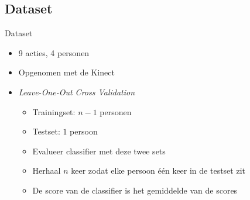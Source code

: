 \documentclass[]{beamer}
\begin{document}
	\subsection{Dataset}
	\begin{frame}{Dataset}
		\begin{itemize}
			\item 9 acties, 4 personen 
			\item Opgenomen met de Kinect
			\item \textit{Leave-One-Out Cross Validation}
			\begin{itemize}
				\item Trainingset: $n - 1$ personen
				\item Testset: $1$ persoon
				\item Evalueer classifier met deze twee sets
				\item Herhaal $n$ keer zodat elke persoon één keer in de testset zit
				\item De score van de classifier is het gemiddelde van de scores
			\end{itemize}
		\end{itemize}
	\end{frame}
\end{document}

